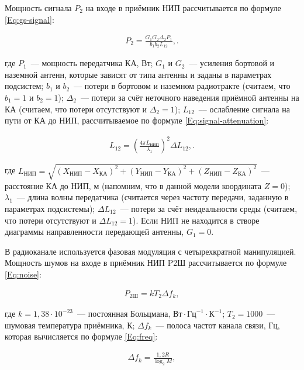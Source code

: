 \documentclass[12pt,a4paper]{article}
\begin{document}
Мощность сигнала $P_2$ на входе в приёмник НИП рассчитывается по формуле
\ref{Eq:gs-signal}:

\begin{eqnarray}
P_2 = \frac{G_1 G_2 \Delta_2 P_1}{b_1 b_2 L_{12}}, \label{Eq:gs-signal}.
\end{eqnarray}

где $P_1$~--– мощность передатчика КА, Вт; $G_1$ и $G_2$~--– усиления бортовой и наземной
антенн, которые зависят от типа антенны и заданы в параметрах подсистем; $b_1$ и $b_2$~--–
потери в бортовом и наземном радиотракте (считаем, что $b_1 = 1$ и $b_2 = 1$);
$\Delta_2$~--– потери за счёт неточного наведения приёмной антенны на КА (считаем, что
потери отсутствуют и $\Delta_2 = 1$); $L_{12}$~--– ослабление сигнала на пути от КА до
НИП, рассчитываемое по формуле \ref{Eq:signal-attenuation}:

\begin{eqnarray}
L_{12} = \left( \frac{4 \pi L_{\text{НИП}}}{\lambda_1} \right)^2 \Delta L_{12}, \label{Eq:signal-attenuation}.
\end{eqnarray}

где $L_{\text{НИП}} = \sqrt{(X_{\text{НИП}} - X_{\text{КА}})^2 + (Y_{\text{НИП}} -
  Y_{\text{КА}})^2 + (Z_{\text{НИП}} - Z_{\text{КА}})^2}$~--- расстояние КА до НИП, м
(напомним, что в данной модели координата $Z = 0$); $\lambda_1$~--- длина волны передатчика
(считается через частоту передачи, заданную в параметрах подсистемы); $\Delta L_{12}$~---
потери за счёт неидеальности среды (считаем, что потери отсутствуют и $\Delta L_{12} = 1$). Если НИП
не находится в створе диаграммы направленности передающей антенны, $G_1 = 0$.

В радиоканале используется фазовая модуляция с четырехкратной манипуляцией. Мощность шумов
на входе в приёмник НИП P2Ш рассчитывается по формуле \ref{Eq:noise}:

\begin{eqnarray}
P_{2\text{Ш}} = k T_2 \Delta f_k, \label{Eq:noise}
\end{eqnarray}

где $k = 1,38 \cdot 10^{-23}$~--- постоянная Больцмана, $\text{Вт} \cdot \text{Гц}^{-1}
\cdot \text{К}^{-1}$; $T_2 = 1000$~--- шумовая температура приёмника, К; $\Delta f_k$~--- полоса
частот канала связи, Гц, которая вычисляется по формуле \ref{Eq:freq}:

\begin{eqnarray}
\Delta f_k = \frac{1,2 R}{\log_2{M}}, \label{Eq:freq}
\end{eqnarray}
\end{document}
